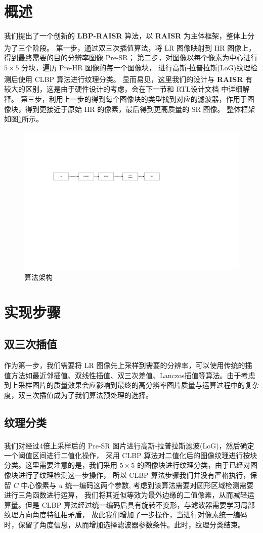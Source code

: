 \documentclass[12pt, a4paper, oneside]{ctexbook}
\begin{document}
	\section{概述}
	我们提出了一个创新的 \textbf{LBP-RAISR} 算法，以 \textbf{RAISR} 为主体框架，整体上分为了三个阶段。
	第一步，通过双三次插值算法\textsuperscript{\cite{4}\cite{5}}，将 LR 图像映射到 HR 图像上，得到最终需要的目的分辨率图像 Pre-SR；
	第二步，对图像以每个像素为中心进行 $5\times5$ 分块，遍历 Pre-HR 图像的每一个图像块，
	进行高斯-拉普拉斯(LoG)纹理检测后使用 CLBP 算法\textsuperscript{\cite{8}\cite{9}}进行纹理分类。
	显而易见，这里我们的设计与 \textbf{RAISR} 有较大的区别，这是由于硬件设计的考虑，会在下一节和 RTL设计文档 中详细解释。
	第三步，利用上一步的得到每个图像块的类型找到对应的滤波器，作用于图像块，得到更接近于原始 HR 的像素，最后得到更高质量的 SR 图像。
	整体框架如图\ref{overview}所示。
	\begin{figure}[h]
		\centering
		\includegraphics[scale=0.72]{./pic/overview.pdf}
		\caption{算法架构}
		\label{overview}
	\end{figure}
	\section{实现步骤}
	\subsection{双三次插值}
	作为第一步，我们需要将 LR 图像先上采样到需要的分辨率，可以使用传统的插值方法如最近邻插值、双线性插值、双三次差值、Lanczos插值等算法。由于考虑到上采样图片的质量效果会应影响到最终的高分辨率图片质量与运算过程中的复杂度，双三次插值成为了我们算法预处理的选择。
	\subsection{纹理分类}
	我们对经过4倍上采样后的 Pre-SR 图片进行高斯-拉普拉斯滤波(LoG)\textsuperscript{\cite{12}}，然后确定一个阈值区间进行二值化操作，
	采用 CLBP 算法对二值化后的图像纹理进行按块分类。这里需要注意的是，我们采用 $5 \times 5$ 的图像块进行纹理分类，由于已经对图像块进行了纹理检测这一步操作，
	所以 CLBP 算法步骤我们并没有严格执行，保留 $C$ 中心像素与 $u$ 统一编码这两个参数, 考虑到该算法需要对圆形区域检测需要进行三角函数进行运算，
	我们将其近似等效为最外边缘的二值像素，从而减轻运算量。但是 CLBP 算法经过统一编码后具有旋转不变形，与滤波器需要学习局部纹理方向角度特征相矛盾，
	故此我们增加了一步操作，当进行对像素统一编码时，保留了角度信息，从而增加选择滤波器参数条件。此时，纹理分类结束。
\end{document}
